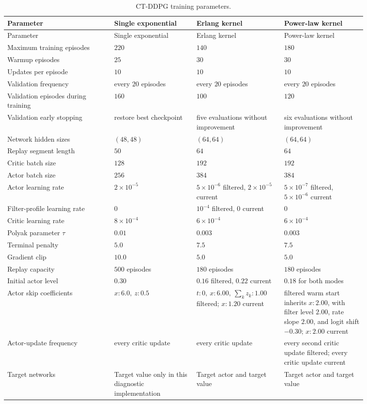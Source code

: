 \documentclass[11pt]{article}
\begin{document}
\begin{longtable}{p{0.26\linewidth}p{0.20\linewidth}p{0.20\linewidth}p{0.20\linewidth}}
\caption{CT-DDPG training parameters.}
\label{tab:ctddpg_parameters}\\
\toprule
Parameter & Single exponential & Erlang kernel & Power-law kernel \\
\midrule
\endfirsthead
\toprule
Parameter & Single exponential & Erlang kernel & Power-law kernel \\
\midrule
\endhead
\bottomrule
\endfoot
Maximum training episodes & \(220\) & \(140\) & \(180\) \\
Warmup episodes & \(25\) & \(30\) & \(30\) \\
Updates per episode & \(10\) & \(10\) & \(10\) \\
Validation frequency & every \(20\) episodes & every \(20\) episodes & every \(20\) episodes \\
Validation episodes during training & \(160\) & \(100\) & \(120\) \\
Validation early stopping & restore best checkpoint & five evaluations without improvement & six evaluations without improvement \\
Network hidden sizes & \((48,48)\) & \((64,64)\) & \((64,64)\) \\
Replay segment length & \(50\) & \(64\) & \(64\) \\
Critic batch size & \(128\) & \(192\) & \(192\) \\
Actor batch size & \(256\) & \(384\) & \(384\) \\
Actor learning rate & \(2\times10^{-5}\) & \(5\times10^{-6}\) filtered, \(2\times10^{-5}\) current & \(5\times10^{-7}\) filtered, \(5\times10^{-6}\) current \\
Filter-profile learning rate & \(0\) & \(10^{-4}\) filtered, \(0\) current & \(0\) \\
Critic learning rate & \(8\times10^{-4}\) & \(6\times10^{-4}\) & \(6\times10^{-4}\) \\
Polyak parameter \(\tau\) & \(0.01\) & \(0.003\) & \(0.003\) \\
Terminal penalty & \(5.0\) & \(7.5\) & \(7.5\) \\
Gradient clip & \(10.0\) & \(5.0\) & \(5.0\) \\
Replay capacity & \(500\) episodes & \(180\) episodes & \(180\) episodes \\
Initial actor level & \(0.30\) & \(0.16\) filtered, \(0.22\) current & \(0.18\) for both modes \\
Actor skip coefficients &
\(x:6.0,\ z:0.5\) &
\(t:0,\ x:6.00,\ \sum_k z_k:1.00\) filtered; \(x:1.20\) current &
filtered warm start inherits \(x:2.00\), with filter level \(2.00\), rate slope \(2.00\), and logit shift \(-0.30\); \(x:2.00\) current \\
Actor-update frequency & every critic update & every critic update & every second critic update filtered; every critic update current \\
Target networks &
Target value only in this diagnostic implementation &
Target actor and target value &
Target actor and target value \\
\end{longtable}
\end{document}
